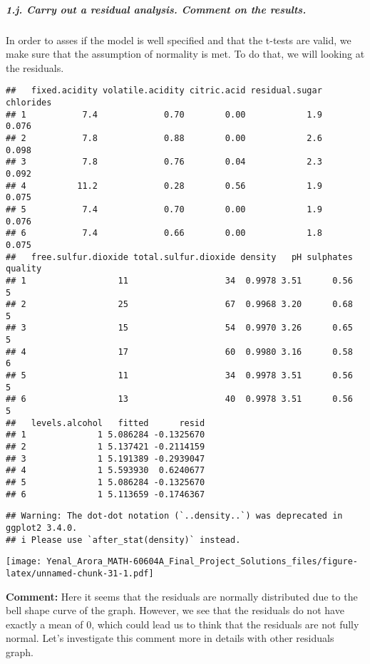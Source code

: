 \documentclass[
]{article}
\begin{document}
\hypertarget{j.-carry-out-a-residual-analysis.-comment-on-the-results.}{%
\subparagraph{1.j. Carry out a residual analysis. Comment on the
results.}\label{j.-carry-out-a-residual-analysis.-comment-on-the-results.}}

In order to asses if the model is well specified and that the t-tests
are valid, we make sure that the assumption of normality is met. To do
that, we will looking at the residuals.

\begin{verbatim}
##   fixed.acidity volatile.acidity citric.acid residual.sugar chlorides
## 1           7.4             0.70        0.00            1.9     0.076
## 2           7.8             0.88        0.00            2.6     0.098
## 3           7.8             0.76        0.04            2.3     0.092
## 4          11.2             0.28        0.56            1.9     0.075
## 5           7.4             0.70        0.00            1.9     0.076
## 6           7.4             0.66        0.00            1.8     0.075
##   free.sulfur.dioxide total.sulfur.dioxide density   pH sulphates quality
## 1                  11                   34  0.9978 3.51      0.56       5
## 2                  25                   67  0.9968 3.20      0.68       5
## 3                  15                   54  0.9970 3.26      0.65       5
## 4                  17                   60  0.9980 3.16      0.58       6
## 5                  11                   34  0.9978 3.51      0.56       5
## 6                  13                   40  0.9978 3.51      0.56       5
##   levels.alcohol   fitted      resid
## 1              1 5.086284 -0.1325670
## 2              1 5.137421 -0.2114159
## 3              1 5.191389 -0.2939047
## 4              1 5.593930  0.6240677
## 5              1 5.086284 -0.1325670
## 6              1 5.113659 -0.1746367
\end{verbatim}

\begin{verbatim}
## Warning: The dot-dot notation (`..density..`) was deprecated in ggplot2 3.4.0.
## i Please use `after_stat(density)` instead.
\end{verbatim}

\texttt{[image: Yenal\_Arora\_MATH-60604A\_Final\_Project\_Solutions\_files/figure-latex/unnamed-chunk-31-1.pdf]}

\textbf{Comment:} Here it seems that the residuals are normally
distributed due to the bell shape curve of the graph. However, we see
that the residuals do not have exactly a mean of 0, which could lead us
to think that the residuals are not fully normal. Let's investigate this
comment more in details with other residuals graph.
\end{document}
